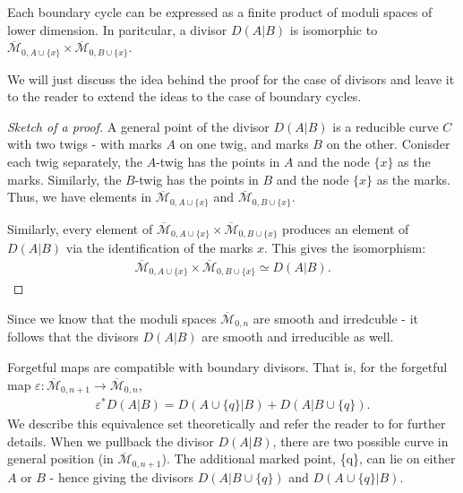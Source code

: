 \begin{proposition}
    Each boundary cycle can be expressed as a finite product of moduli spaces of lower dimension. 
    In paritcular, a divisor $D(A|B)$ is isomorphic to $\overline{\mathcal{M}}_{0,A \cup \{x\}} \times \overline{\mathcal{M}}_{0,B \cup \{x\}}$.
\par We will just discuss the idea behind the proof for the case of divisors and leave it to the reader to extend the ideas to the case of boundary cycles.
\end{proposition}
\begin{proof}[Sketch of a proof]
    A general point of the divisor $D(A|B)$ is a reducible curve $C$ with two twigs - with marks $A$ on one twig, and marks $B$ on the other.
    Conisder each twig separately, the $A$-twig has the points in $A$ and the node $\{x\}$ as the marks.
    Similarly, the $B$-twig has the points in $B$ and the node $\{x\}$ as the marks.
    Thus, we have elements in $\overline{\mathcal{M}}_{0,A\cup \{x\}}$ and $\overline{\mathcal{M}}_{0,B\cup \{x\}}$.
    \par Similarly, every element of $\overline{\mathcal{M}}_{0,A\cup \{x\}} \times \overline{\mathcal{M}}_{0,B\cup \{x\}}$ produces an element of $D(A|B)$ via the identification of the marks $x$.
    This gives the isomorphism:
    \begin{align*}
        \overline{\mathcal{M}}_{0,A\cup \{x\}} \times \overline{\mathcal{M}}_{0,B\cup \{x\}} \simeq D(A|B).
    \end{align*}
\end{proof}

Since we know that the moduli spaces $\overline{\mathcal{M}}_{0,n}$ are smooth and irredcuble - it follows that the divisors $D(A|B)$ are smooth and irreducible as well.

\begin{remark}
    \label{divCompRmk}
    Forgetful maps are compatible with boundary divisors. That is, for the forgetful map $\varepsilon : \overline{\mathcal{M}}_{0,n+1} \to \overline{\mathcal{M}}_{0,n}$,
    \begin{align*}
        \varepsilon^{*}D(A|B) = D(A \cup \{q\}|B) + D(A |B\cup \{q\}).
    \end{align*}
    We describe this equivalence set theoretically and refer the reader to \cite{KockQcohom} for further details. 
    When we pullback the divisor $D(A|B)$, there are two possible curve in general position (in $\overline{\mathcal{M}}_{0,n+1}$).
    The additional marked point, \{q\}, can lie on either $A$ or $B$ - hence giving the divisors $D(A |B\cup \{q\})$ and $D(A \cup \{q\}|B)$.
\end{remark}

